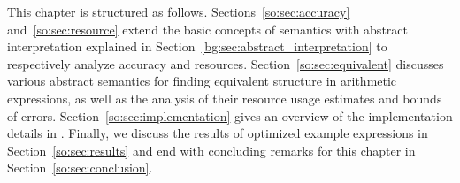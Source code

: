 This chapter is structured as follows.  Sections~\ref{so:sec:accuracy}
and~\ref{so:sec:resource} extend the basic concepts of semantics with abstract
interpretation explained in Section~\ref{bg:sec:abstract_interpretation} to
respectively analyze accuracy and resources.  Section~\ref{so:sec:equivalent}
discusses various abstract semantics for finding equivalent structure in
arithmetic expressions, as well as the analysis of their resource usage
estimates and bounds of errors.  Section~\ref{so:sec:implementation}
gives an overview of the implementation details in \soap.  Finally,
we discuss the results of optimized example expressions in
Section~\ref{so:sec:results} and end with concluding remarks for this chapter
in Section~\ref{so:sec:conclusion}.
